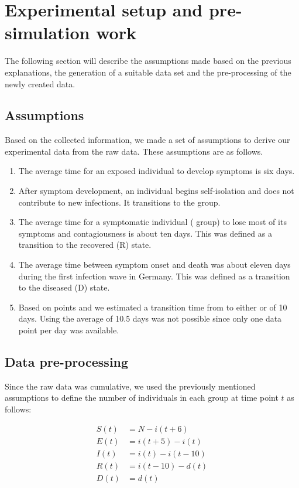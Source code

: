 \section{Experimental setup and pre-simulation work}
The following section will describe the assumptions made based on the previous explanations, the generation of a suitable data set and
the pre-processing of the newly created data.


\subsection{Assumptions}
Based on the collected information, we made a set of assumptions to derive our experimental data from the raw data.
These assumptions are as follows.

\begin{enumerate}
	\item The average time for an exposed individual to develop symptoms is six days.
	\item After symptom development, an individual begins self-isolation and does not contribute to new infections. It transitions to the  group.
	\item The average time for a symptomatic individual ( group) to lose most of its symptoms and contagiousness is about ten days. This was defined as
		a transition to the recovered (R) state.
	\item The average time between symptom onset and death was about eleven days during the first infection wave in Germany. This was
		defined as a transition to the diseased (D) state.
	\item Based on points  and  we estimated a transition time from  to either  or  of 10 days. Using the
		average of 10.5 days was not possible since only one data point per day was available.
\end{enumerate}


\subsection{Data pre-processing}
Since the raw data was cumulative, we used the previously mentioned assumptions to define the number of individuals in each group at time point $t$ as follows:

\begin{align}
	S(t) &= N - i(t+6)\\
	E(t) &= i(t+5) - i(t)\\
	I(t) &= i(t) - i(t-10)\\
	R(t) &= i(t-10) - d(t)\\
	D(t) &= d(t)
\end{align}

